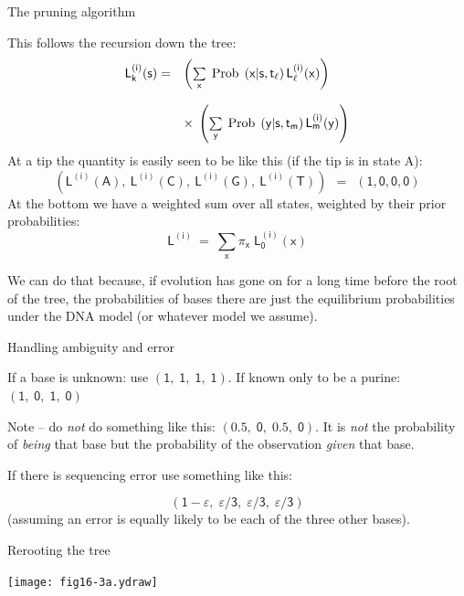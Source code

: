 \documentclass[bluish,slideColor,colorBG,pdf]{prosper}
\def\prob{{\rm \;Prob\;}}
\begin{document}
\begin{slide}[Replace]{The pruning algorithm}

This follows the recursion down the tree:
{
\[
\begin{array}{c l}
\mathsf{L_k^{(i)}(s)  =} & \mathsf{\left(\sum\limits_x \prob\left(x|s, t_\ell\right) L_\ell^{(i)}(x) \right)}\\
& \\
 & \mathsf{\times\;\left(\sum\limits_y \prob\left(y|s, t_m\right) L_m^{(i)}(y)  \right)}
\end{array}
\]
}
At a tip the quantity is easily seen to be like this (if the tip is in state A):
{
\[
\mathsf{\left(L^{(i)}(A), \ L^{(i)}(C), \ L^{(i)}(G), \ L^{(i)}(T) \right) \ \
= \ \ (1, 0, 0, 0)}
\]
}
At the bottom we have a weighted sum over all states, weighted by their
prior probabilities:
{
\[
\mathsf{L^{(i)} \ = \ \sum\limits_x \pi_x\; L_0^{(i)}(x)}
\]
}
\medskip

We can do that because, if evolution has gone on for a long time before
the root of the tree, the probabilities of bases there are just the
equilibrium probabilities under the DNA model (or whatever model we assume).

\end{slide}

\begin{slide}[Replace]{Handling ambiguity and error}

If a base is unknown: use $\mathsf{(1,\;1,\;1,\;1)}$.  If known only to be a purine:
$\mathsf{(1,\;0,\;1,\;0)}$
\bigskip

Note -- do {\it not} do something like this: $\mathsf{(0.5,\;0,\;0.5,\;0)}$.  It is
{\it not} the probability of {\it being} that base but the probability of the
observation {\it given} that base.
\bigskip

If there is sequencing error use something like this:

\[
\mathsf{(1-\varepsilon,\; \varepsilon/3,\;\varepsilon/3,\;\varepsilon/3)}
\]
(assuming an error is equally likely to be each of the three other bases).


\end{slide}

\begin{slide}[Replace]{Rerooting the tree}

\centerline{\texttt{[image: fig16-3a.ydraw]}}

\end{slide}
\end{document}
